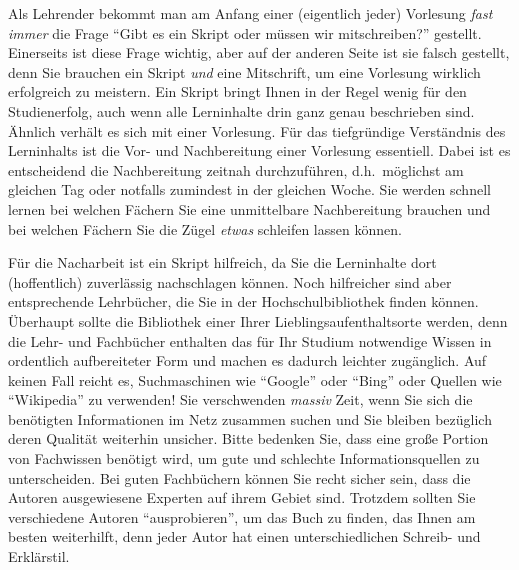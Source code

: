 \goodbreak
\bigskip

Als Lehrender bekommt man am Anfang einer (eigentlich jeder) Vorlesung \emph{fast immer} die 
Frage "`Gibt es ein Skript oder müssen wir mitschreiben?"' gestellt. Einerseits ist diese Frage
wichtig, aber auf der anderen Seite ist sie falsch gestellt, denn Sie brauchen ein Skript
\emph{und} eine Mitschrift, um eine Vorlesung wirklich erfolgreich zu meistern. Ein Skript 
bringt Ihnen in der Regel wenig für den Studienerfolg, auch wenn alle Lerninhalte drin ganz genau 
beschrieben sind. Ähnlich verhält es sich mit einer Vorlesung. Für das tiefgründige Verständnis des 
Lerninhalts ist die Vor- und Nachbereitung einer Vorlesung essentiell. Dabei ist es entscheidend die
Nachbereitung zeitnah durchzuführen, d.h.~möglichst am gleichen Tag oder notfalls
zumindest in der gleichen Woche. Sie werden schnell lernen bei welchen Fächern Sie eine
unmittelbare Nachbereitung brauchen und bei welchen Fächern Sie die Zügel 
\emph{etwas} schleifen lassen können.

Für die Nacharbeit ist ein Skript hilfreich, da Sie die Lerninhalte dort (hoffentlich) zuverlässig 
nachschlagen können. Noch hilfreicher sind aber entsprechende Lehrbücher, die Sie in der 
Hochschulbibliothek finden können. Überhaupt sollte die Bibliothek einer Ihrer 
Lieblingsaufenthaltsorte werden, denn die Lehr- und Fachbücher enthalten das für Ihr Studium 
notwendige Wissen in ordentlich aufbereiteter Form und machen es dadurch leichter zugänglich. Auf 
keinen Fall reicht es,  Suchmaschinen wie "`Google"' oder "`Bing"' oder 
Quellen wie "`Wikipedia"' zu verwenden! Sie  verschwenden \emph{massiv} Zeit, 
wenn Sie sich die benötigten Informationen im Netz zusammen  suchen und Sie bleiben bezüglich 
deren Qualität weiterhin unsicher. Bitte bedenken Sie, dass eine große Portion von Fachwissen benötigt 
wird, um gute und schlechte Informationsquellen zu unterscheiden. Bei guten Fachbüchern können Sie 
recht sicher sein, dass die Autoren ausgewiesene Experten auf ihrem Gebiet sind. Trotzdem sollten Sie 
verschiedene Autoren "`ausprobieren"', um das Buch zu finden, das Ihnen am besten weiterhilft, denn 
jeder Autor hat einen unterschiedlichen Schreib- und Erklärstil. 

